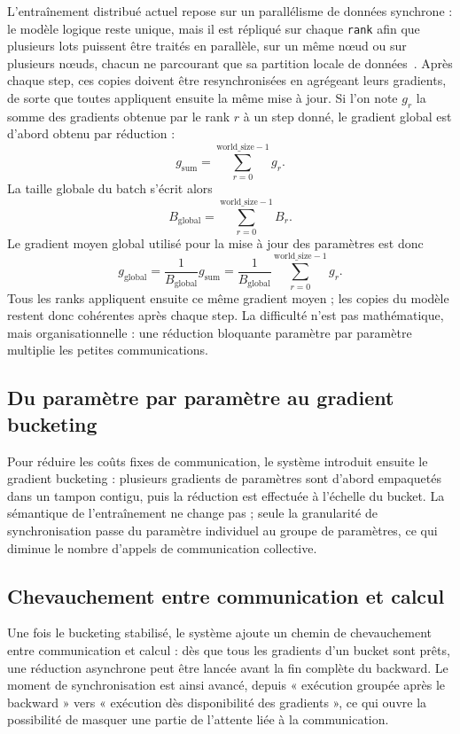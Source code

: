 \documentclass[a4paper,11pt,oneside]{article}
\begin{document}
L'entraînement distribué actuel repose sur un parallélisme de données synchrone : le modèle logique reste unique, mais il est répliqué sur chaque \texttt{rank} afin que plusieurs lots puissent être traités en parallèle, sur un même n\oe ud ou sur plusieurs n\oe uds, chacun ne parcourant que sa partition locale de données~\cite{sergeev2018horovod}. Après chaque step, ces copies doivent être resynchronisées en agrégeant leurs gradients, de sorte que toutes appliquent ensuite la même mise à jour. Si l'on note $g_r$ la somme des gradients obtenue par le rank $r$ à un step donné, le gradient global est d'abord obtenu par réduction :
\[
g_{\mathrm{sum}}=\sum_{r=0}^{\mathrm{world\_size}-1} g_r.
\]
La taille globale du batch s'écrit alors
\[
B_{\mathrm{global}}=\sum_{r=0}^{\mathrm{world\_size}-1} B_r.
\]
Le gradient moyen global utilisé pour la mise à jour des paramètres est donc
\[
g_{\mathrm{global}}
=\frac{1}{B_{\mathrm{global}}}g_{\mathrm{sum}}
=\frac{1}{B_{\mathrm{global}}}\sum_{r=0}^{\mathrm{world\_size}-1} g_r.
\]
Tous les ranks appliquent ensuite ce même gradient moyen ; les copies du modèle restent donc cohérentes après chaque step. La difficulté n'est pas mathématique, mais organisationnelle : une réduction bloquante paramètre par paramètre multiplie les petites communications.

\subsection{Du paramètre par paramètre au gradient bucketing}

Pour réduire les coûts fixes de communication, le système introduit ensuite le gradient bucketing : plusieurs gradients de paramètres sont d'abord empaquetés dans un tampon contigu, puis la réduction est effectuée à l'échelle du bucket. La sémantique de l'entraînement ne change pas ; seule la granularité de synchronisation passe du paramètre individuel au groupe de paramètres, ce qui diminue le nombre d'appels de communication collective.

\subsection{Chevauchement entre communication et calcul}

Une fois le bucketing stabilisé, le système ajoute un chemin de chevauchement entre communication et calcul : dès que tous les gradients d'un bucket sont prêts, une réduction asynchrone peut être lancée avant la fin complète du backward. Le moment de synchronisation est ainsi avancé, depuis « exécution groupée après le backward » vers « exécution dès disponibilité des gradients », ce qui ouvre la possibilité de masquer une partie de l'attente liée à la communication.
\end{document}
